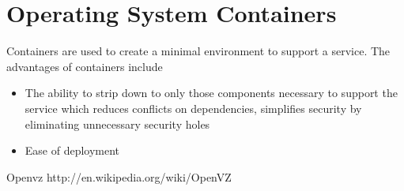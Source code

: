 \chapter{Operating System Containers}
Containers are used to create a minimal environment to support a service.  The advantages of containers include
\begin{itemize}
  \item The ability to strip down to only those components necessary to support the service which reduces conflicts on dependencies,
simplifies security by eliminating unnecessary security holes
  \item Ease of deployment
 \end{itemize}


Openvz http://en.wikipedia.org/wiki/OpenVZ
